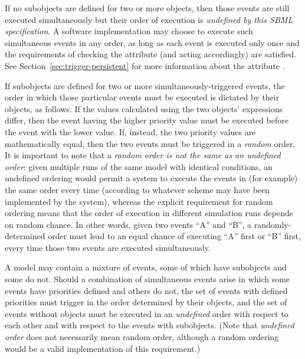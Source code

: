 If no \Priority subobjects are defined for two or more \Event
objects, then those events are still executed simultaneously but
their order of execution is \emph{undefined by this SBML
  specification}.  A software implementation may choose to execute
such simultaneous events in any order, as long as each event is
executed only once and the requirements of checking the
 attribute (and acting accordingly) are
satisfied.  See Section~\ref{sec:trigger-persistent} for more
information about the attribute .

If \Priority subobjects are defined for two or more
simultaneously-triggered events, the order in which those particular
events must be executed is dictated by their \Priority objects,
as follows.  If the values calculated using the two \Priority
objects'  expressions differ, then the event having
the higher priority value must be executed before the event with
the lower value.  If, instead, the two priority values are
mathematically equal, then the two events must be triggered in a
\emph{random} order.  It is important to note that a \emph{random
  order is not the same as an undefined order}: given multiple
runs of the same model with identical conditions, an undefined
ordering would permit a system to execute the events in (for
example) the same order every time (according to whatever scheme
may have been implemented by the system), whereas the explicit
requirement for random ordering means that the order of execution
in different simulation runs depends on random chance.  In other
words, given two events ``A'' and ``B'', a randomly-determined
order must lead to an equal chance of executing ``A'' first or
``B'' first, every time those two events are executed
simultaneously.

A model may contain a mixture of events, some of which have
\Priority subobjects and some do not.  Should a combination of
simultaneous events arise in which some events have priorities
defined and others do not, the set of events with defined
priorities must trigger in the order determined by their \Priority
objects, and the set of events without \Priority objects must be
executed in an \emph{undefined} order with respect to each other
and with respect to the events with \Priority subobjects.  (Note
that \emph{undefined order} does not necessarily mean random
order, although a random ordering would be a valid implementation
of this requirement.)

